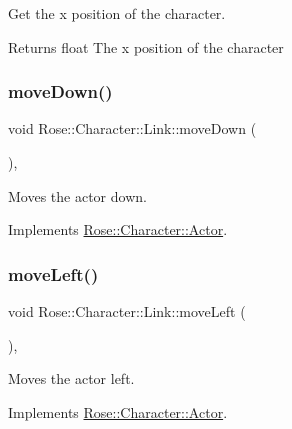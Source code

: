 Get the x position of the character. 

\begin{DoxyReturn}{Returns}
float The x position of the character 
\end{DoxyReturn}
\mbox{\label{classRose_1_1Character_1_1Link_a3e1834381624bf9012ea3921695d9007}} 
\subsubsection{\texorpdfstring{moveDown()}{moveDown()}}
{\footnotesize\ttfamily void Rose\+::\+Character\+::\+Link\+::move\+Down (\begin{DoxyParamCaption}{ }\end{DoxyParamCaption})\hspace{0.3cm}{\ttfamily [override]}, {\ttfamily [virtual]}}



Moves the actor down. 



Implements \mbox{\hyperlink{classRose_1_1Character_1_1Actor_a3ccb744404ed29c77fe9420f274a6826}{Rose\+::\+Character\+::\+Actor}}.

\mbox{\label{classRose_1_1Character_1_1Link_aab6113b81cfa995d11c6aa34894021cf}} 
\subsubsection{\texorpdfstring{moveLeft()}{moveLeft()}}
{\footnotesize\ttfamily void Rose\+::\+Character\+::\+Link\+::move\+Left (\begin{DoxyParamCaption}{ }\end{DoxyParamCaption})\hspace{0.3cm}{\ttfamily [override]}, {\ttfamily [virtual]}}



Moves the actor left. 



Implements \mbox{\hyperlink{classRose_1_1Character_1_1Actor_a45191259db61cf46cb3d99bf186b48d3}{Rose\+::\+Character\+::\+Actor}}.

